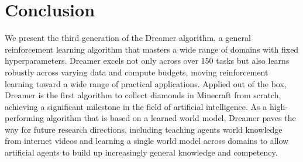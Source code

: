 \section*{Conclusion}
\label{sec:discussion}

We present the third generation of the Dreamer algorithm, a general reinforcement learning algorithm that masters a wide range of domains with fixed hyperparameters.
Dreamer excels not only across over 150 tasks but also learns robustly across varying data and compute budgets, moving reinforcement learning toward a wide range of practical applications.
Applied out of the box, Dreamer is the first algorithm to collect diamonds in Minecraft from scratch, achieving a significant milestone in the field of artificial intelligence.
As a high-performing algorithm that is based on a learned world model, Dreamer paves the way for future research directions, including teaching agents world knowledge from internet videos and learning a single world model across domains to allow artificial agents to build up increasingly general knowledge and competency.
